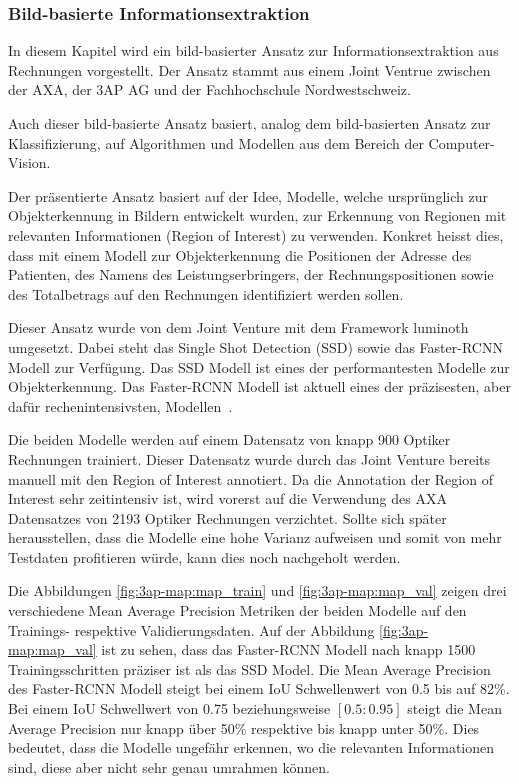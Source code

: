 \subsubsection{Bild-basierte Informationsextraktion}

In diesem Kapitel wird ein bild-basierter Ansatz zur Informationsextraktion aus Rechnungen vorgestellt. Der Ansatz stammt aus einem Joint Ventrue zwischen der AXA, der 3AP AG und der Fachhochschule Nordwestschweiz. 

Auch dieser bild-basierte Ansatz basiert, analog dem bild-basierten Ansatz zur Klassifizierung, auf Algorithmen und Modellen aus dem Bereich der Computer-Vision.

Der präsentierte Ansatz basiert auf der Idee, Modelle, welche ursprünglich zur Objekterkennung in Bildern entwickelt wurden, zur Erkennung von Regionen mit relevanten Informationen (Region of Interest) zu verwenden. Konkret heisst dies, dass mit einem Modell zur Objekterkennung die Positionen der Adresse des Patienten, des Namens des Leistungserbringers, der Rechnungspositionen sowie des Totalbetrags auf den Rechnungen identifiziert werden sollen. 

Dieser Ansatz wurde von dem Joint Venture mit dem Framework luminoth umgesetzt. Dabei steht das Single Shot Detection (SSD) sowie das Faster-RCNN Modell zur Verfügung. Das SSD Modell ist eines der performantesten Modelle zur Objekterkennung. Das Faster-RCNN Modell ist aktuell eines der präzisesten, aber dafür rechenintensivsten, Modellen~\autocite{SSDFRCNN}.

Die beiden Modelle werden auf einem Datensatz von knapp 900 Optiker Rechnungen trainiert. Dieser Datensatz wurde durch das Joint Venture bereits manuell mit den Region of Interest annotiert. Da die Annotation der Region of Interest sehr zeitintensiv ist, wird vorerst auf die Verwendung des AXA Datensatzes von 2193 Optiker Rechnungen verzichtet. Sollte sich später herausstellen, dass die Modelle eine hohe Varianz aufweisen und somit von mehr Testdaten profitieren würde, kann dies noch nachgeholt werden.

Die Abbildungen \ref{fig:3ap-map:map_train} und \ref{fig:3ap-map:map_val} zeigen drei verschiedene Mean Average Precision Metriken der beiden Modelle auf den Trainings- respektive Validierungsdaten. Auf der Abbildung \ref{fig:3ap-map:map_val} ist zu sehen, dass das Faster-RCNN Modell nach knapp 1500 Trainingsschritten präziser ist als das SSD Model. Die Mean Average Precision des Faster-RCNN Modell steigt bei einem IoU Schwellenwert von 0.5 bis auf 82\%. Bei einem IoU Schwellwert von 0.75 beziehungsweise $[0.5:0.95]$ steigt die Mean Average Precision nur knapp über 50\% respektive bis knapp unter 50\%. Dies bedeutet, dass die Modelle ungefähr erkennen, wo die relevanten Informationen sind, diese aber nicht sehr genau umrahmen können.

